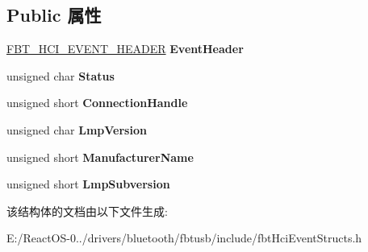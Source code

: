 \subsection*{Public 属性}
\begin{DoxyCompactItemize}
\item 
\mbox{\label{struct_f_b_t___h_c_i___r_e_a_d___r_e_m_o_t_e___v_e_r_s_i_o_n___i_n_f_o_r_m_a_t_i_o_n___c_o_m_p_l_e_t_e_aa3dd5470ff46a36a7ad23302f87085e5}} 
\hyperlink{struct_f_b_t___h_c_i___e_v_e_n_t___h_e_a_d_e_r}{F\+B\+T\+\_\+\+H\+C\+I\+\_\+\+E\+V\+E\+N\+T\+\_\+\+H\+E\+A\+D\+ER} {\bfseries Event\+Header}
\item 
\mbox{\label{struct_f_b_t___h_c_i___r_e_a_d___r_e_m_o_t_e___v_e_r_s_i_o_n___i_n_f_o_r_m_a_t_i_o_n___c_o_m_p_l_e_t_e_a28d37ef9d9ba9115e0ccacf677576da5}} 
unsigned char {\bfseries Status}
\item 
\mbox{\label{struct_f_b_t___h_c_i___r_e_a_d___r_e_m_o_t_e___v_e_r_s_i_o_n___i_n_f_o_r_m_a_t_i_o_n___c_o_m_p_l_e_t_e_a7ebde37ef3c8e1394540c8778ef03904}} 
unsigned short {\bfseries Connection\+Handle}
\item 
\mbox{\label{struct_f_b_t___h_c_i___r_e_a_d___r_e_m_o_t_e___v_e_r_s_i_o_n___i_n_f_o_r_m_a_t_i_o_n___c_o_m_p_l_e_t_e_a6b17cba2cf37ae2d8bb6b8ebb5ee96ac}} 
unsigned char {\bfseries Lmp\+Version}
\item 
\mbox{\label{struct_f_b_t___h_c_i___r_e_a_d___r_e_m_o_t_e___v_e_r_s_i_o_n___i_n_f_o_r_m_a_t_i_o_n___c_o_m_p_l_e_t_e_a623cb78a5fc1d476343641120ca24e03}} 
unsigned short {\bfseries Manufacturer\+Name}
\item 
\mbox{\label{struct_f_b_t___h_c_i___r_e_a_d___r_e_m_o_t_e___v_e_r_s_i_o_n___i_n_f_o_r_m_a_t_i_o_n___c_o_m_p_l_e_t_e_a620bd3f3f3bf1ea7caf86b72c3b199dd}} 
unsigned short {\bfseries Lmp\+Subversion}
\end{DoxyCompactItemize}


该结构体的文档由以下文件生成\+:\begin{DoxyCompactItemize}
\item 
E\+:/\+React\+O\+S-\/0../drivers/bluetooth/fbtusb/include/fbt\+Hci\+Event\+Structs.\+h\end{DoxyCompactItemize}
